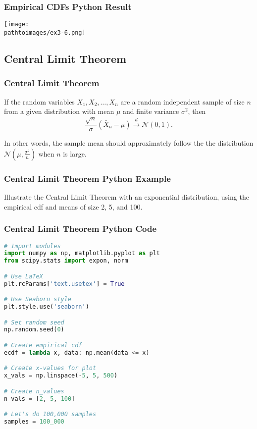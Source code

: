 \documentclass{beamer}
\newcommand{\pathtoimages}{/Users/charlesrambo/Desktop/Bootcamp24/Images}
\begin{document}
\begin{frame}[fragile]
\frametitle{Empirical CDFs Python Result}
\begin{center}
\texttt{[image: \\pathtoimages/ex3-6.png]}
\end{center}

\end{frame}

\subsection{Central Limit Theorem}

\begin{frame}
\frametitle{Central Limit Theorem}

\begin{Theorem}
If the random variables $X_1, X_2, \ldots, X_n$ are a random independent sample of size $n$ from a given distribution with mean $\mu$ and finite variance $\sigma^2$, then
$$
\frac{\sqrt{n}}{\sigma}\left(\bar{X}_n - \mu\right)\stackrel{d}{\longrightarrow} \mathcal{N}(0, 1).
$$
\end{Theorem}
In other words, the sample mean should approximately follow the the distribution $\mathcal{N}\left(\mu, \frac{\sigma^2}{n}\right)$ when $n$ is large.
\end{frame}

\begin{frame}[t]
\frametitle{Central Limit Theorem Python Example}
\begin{Example}
Illustrate the Central Limit Theorem with an exponential distribution, using the empirical cdf and means of size 2, 5, and 100.
\end{Example}

\end{frame}

\begin{frame}[fragile]
\frametitle{Central Limit Theorem Python Code}
\begin{lstlisting}[language=Python]
# Import modules
import numpy as np, matplotlib.pyplot as plt
from scipy.stats import expon, norm

# Use LaTeX
plt.rcParams['text.usetex'] = True

# Use Seaborn style
plt.style.use('seaborn')

# Set random seed
np.random.seed(0)

# Create empirical cdf
ecdf = lambda x, data: np.mean(data <= x)

# Create x-values for plot
x_vals = np.linspace(-5, 5, 500)

# Create n_values
n_vals = [2, 5, 100]

# Let's do 100,000 samples
samples = 100_000
\end{lstlisting}

\end{frame}
\end{document}
